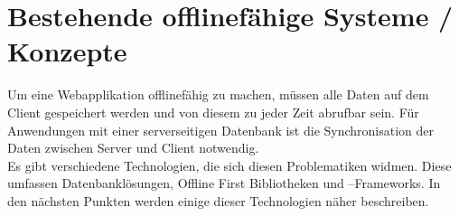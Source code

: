 %
%
\chapter{\label{chap:state}Bestehende offlinefähige Systeme / Konzepte}
Um eine Webapplikation offlinefähig zu machen, müssen alle Daten auf dem Client gespeichert werden und von diesem zu jeder Zeit abrufbar sein.
Für Anwendungen mit einer serverseitigen Datenbank ist die Synchronisation der Daten zwischen Server und Client notwendig.\\
Es gibt verschiedene Technologien, die sich diesen Problematiken widmen.
Diese umfassen Datenbanklösungen, Offline First Bibliotheken und --Frameworks. In den nächsten Punkten werden einige dieser Technologien näher beschreiben.
%
%

%
%

%
%

%
%

%
%

